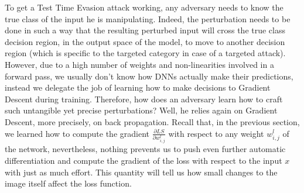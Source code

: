 \documentclass[LaM,binding=0.6cm]{./packages/sapthesis/sapthesis}
\begin{document}
        To get a Test Time Evasion attack working, any adversary needs to know the true class of the input he is manipulating. Indeed, the perturbation needs to be done in such a way that 
        the resulting perturbed input will cross the true class decision region, in the output space of the model, to move to another decision region (which is specific to the targeted category in case of a targeted attack).
        However, due to a high number of weights and non-linearities involved in a forward pass, we usually don't know how DNNs actually make their predictions, instead we delegate the job of learning 
        how to make decisions to Gradient Descent during training. Therefore, how does an adversary learn how to craft such untangible yet precise perturbations? Well, he relies again on Gradient Descent, more precisely,
        on back propagation. Recall that, in the previous section, we learned how to compute the gradient $\frac{\partial LS}{\partial w^{l}_{i,j}}$ with respect to any weight $ w^{l}_{i,j} $ of the 
        network, nevertheless, nothing prevents us to push even further automatic differentiation and compute the gradient of the loss with respect to the input $x$ with just as much effort. 
        This quantity will tell us how small changes to the image itself affect the loss function.
        
\end{document}
